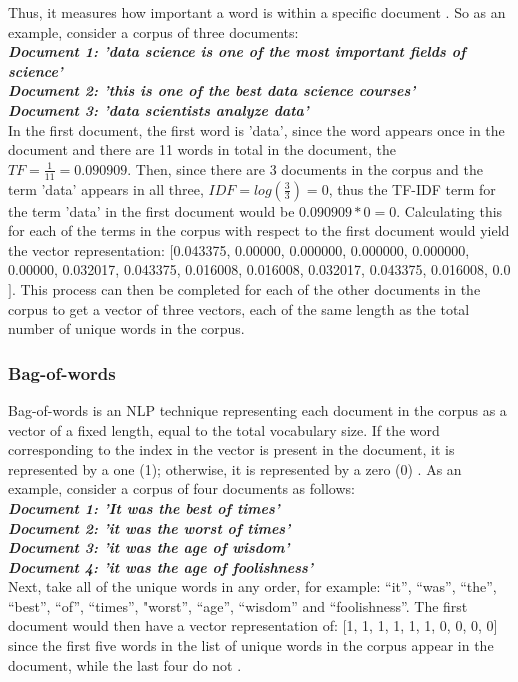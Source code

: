 \documentclass[conference]{IEEEtran}
\begin{document}
Thus, it measures how important a word is within a specific document \cite{tf-idf}. So as an example, consider a corpus of three documents:\\
\textbf{\textit{Document 1: 'data science is one of the most important fields of science'\\
Document 2: 'this is one of the best data science courses'\\
Document 3: 'data scientists analyze data'\\}}
In the first document, the first word is 'data', since the word appears once in the document and there are 11 words in total in the document, the $TF = \frac{1}{11} = 0.090909$. Then, since there are 3 documents in the corpus and the term 'data' appears in all three, $IDF = log(\frac{3}{3}) = 0$, thus the TF-IDF term for the term 'data' in the first document would be $0.090909*0 = 0$. Calculating this for each of the terms in the corpus with respect to the first document would yield the vector representation: $[$0.043375, 0.00000, 0.000000, 0.000000, 0.000000, 0.00000, 0.032017, 0.043375, 0.016008, 0.016008, 0.032017, 0.043375, 0.016008, 0.0$]$. This process can then be completed for each of the other documents in the corpus to get a vector of three vectors, each of the same length as the total number of unique words in the corpus.\\

\subsubsection{Bag-of-words}
Bag-of-words is an NLP technique representing each document in the corpus as a vector of a fixed length, equal to the total vocabulary size. If the word corresponding to the index in the vector is present in the document, it is represented by a one (1); otherwise, it is represented by a zero (0) \cite{bag-of-words}. As an example, consider a corpus of four documents as follows:\\
\textbf{\textit{Document 1: 'It was the best of times'\\
Document 2: 'it was the worst of times'\\
Document 3: 'it was the age of wisdom'\\
Document 4: 'it was the age of foolishness'\\}}
Next, take all of the unique words in any order, for example: “it”, “was”, “the”, “best”, “of”, “times”, "worst”, “age”, “wisdom” and “foolishness”. The first document would then have a vector representation of: $[$1, 1, 1, 1, 1, 1, 0, 0, 0, 0$]$ since the first five words in the list of unique words in the corpus appear in the document, while the last four do not \cite{bow-example}.\\
\end{document}
